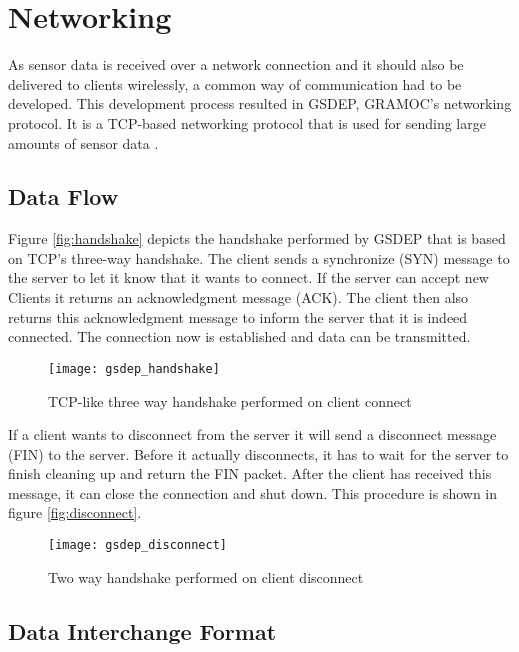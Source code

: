 \chapter{Networking}
\label{ch:networking}

\author{Nico Kratky}
%
As sensor data is received over a network connection and it should also be delivered to clients wirelessly, a common way of communication had to be developed. This development process resulted in GSDEP, GRAMOC's networking protocol. It is a TCP-based networking protocol that is used for sending large amounts of sensor data \autocite{rfc793}.

\section{Data Flow}
\label{sec:networking_data-flow}

Figure \vref{fig:handshake} depicts the handshake performed by GSDEP that is based on TCP's three-way handshake. The client sends a synchronize (SYN) message to the server to let it know that it wants to connect. If the server can accept new Clients it returns an acknowledgment message (ACK). The client then also returns this acknowledgment message to inform the server that it is indeed connected. The connection now is established and data can be transmitted.

\begin{figure}[h]
    \centering
    \texttt{[image: gsdep\_handshake]}
    \caption{TCP-like three way handshake performed on client connect}
    \label{fig:handshake}
\end{figure}

If a client wants to disconnect from the server it will send a disconnect message (FIN) to the server. Before it actually disconnects, it has to wait for the server to finish cleaning up and return the FIN packet. After the client has received this message, it can close the connection and shut down. This procedure is shown in figure \vref{fig:disconnect}.

\begin{figure}[h]
    \centering
    \texttt{[image: gsdep\_disconnect]}
    \caption{Two way handshake performed on client disconnect}
    \label{fig:disconnect}
\end{figure}

\section{Data Interchange Format}

